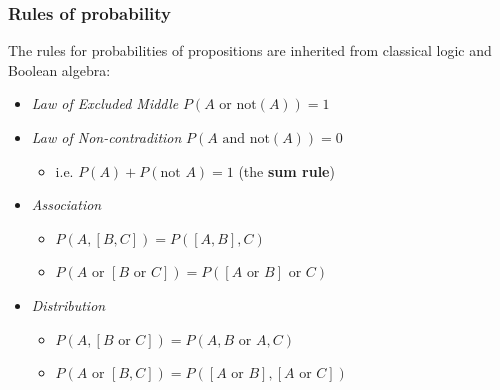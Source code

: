 \begin{frame}

\frametitle{Rules of probability}
\label{rulesofprobability}

The rules for probabilities of propositions are inherited from classical logic and Boolean algebra:

\begin{itemize}
\item \emph{Law of Excluded Middle} $P(A\text{ or not}(A)) = 1$

\item \emph{Law of Non-contradition} $P(A\text{ and not}(A)) = 0$

\begin{itemize}
\item i.e. $P(A) + P(\text{not }A) = 1$ (the \textbf{sum rule})

\end{itemize}

\item \emph{Association}

\begin{itemize}
\item $P(A,[B,C]) = P([A,B],C)$

\item $P(A \text{ or } [B \text{ or }C]) = P([A \text{ or } B] \text{ or }C)$

\end{itemize}

\item \emph{Distribution}

\begin{itemize}
\item $P(A,[B\text{ or }C]) = P(A,B\text{ or }A,C)$

\item $P(A\text{ or }[B,C]) = P([A\text{ or }B],[A\text{ or }C])$

\end{itemize}

\end{itemize}

\end{frame}

